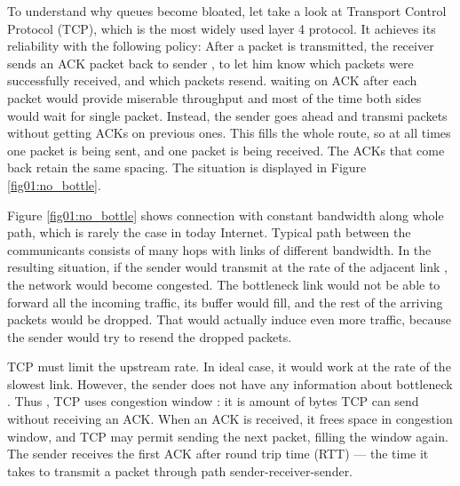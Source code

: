 To understand why  queues become bloated, let  take a look at Transport Control Protocol (TCP), which is  the most widely used layer 4 protocol. It achieves its reliability  with the following policy: After a packet is transmitted, the receiver sends an ACK packet back to sender , to let him know which packets were successfully received, and which packets  resend.  waiting on ACK after each packet would provide miserable throughput and  most of the time both sides would wait for  single packet. Instead, the sender goes ahead and transmi packets without getting ACKs on previous ones. This fills the whole route, so at all times one packet is being sent, and one packet is being received. The ACKs that come back retain the same spacing. The situation is displayed in Figure \ref{fig01:no_bottle}. 

Figure \ref{fig01:no_bottle} shows connection with constant bandwidth along whole path, which is  rarely the case in today Internet. Typical path between the communicants consists of many hops with links of different bandwidth.   In the resulting situation, if the sender would transmit  at the rate of the adjacent link , the network would become congested. The bottleneck link would not be able to forward all the incoming traffic, its buffer would fill, and the rest of the arriving packets would be dropped. That would actually induce even more traffic, because the sender would try to resend the dropped packets.


 TCP must  limit the upstream rate. In ideal case, it would work  at the rate of the slowest link. However, the sender does not have any information about bottleneck . Thus , TCP uses  congestion window : it is  amount of bytes TCP can send without receiving an ACK. When an ACK is received, it frees space in congestion window, and TCP may permit sending the next packet, filling the window again.  The sender receives the first ACK after round trip time (RTT) --- the time it takes to transmit a packet through path sender-receiver-sender. 

